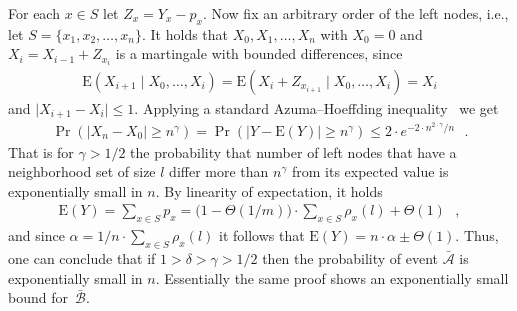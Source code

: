 \let\accentvec\vec \documentclass{llncs}
\newcommand{\keys}{\ensuremath{n}}
\newcommand{\pmf}{\ensuremath{{\rho}}}
\newcommand{\E}{\mathrm{E}}
\newcommand{\blank}{\text{ }}
\newcommand{\low}{\ensuremath{l}}
\newcommand{\abs}[1]{\lvert#1\rvert}
\newcommand{\evA}{{\mathcal{A}}}
\newcommand{\evB}{{\mathcal{B}}}
\begin{document}
For each $x \in S$ let $Z_x=Y_x-p_x$. Now fix an arbitrary order of the left nodes, i.e., let $S=\{x_1,x_2,\ldots,x_n\}$.
It holds that $X_0,X_1,\ldots,X_n$ with $X_0=0$ and $X_i=X_{i-1}+Z_{x_i}$
is a martingale with bounded differences, since 
\begin{align*}
\E(X_{i+1} \mid X_0,\ldots,X_i)= \E(X_{i}+Z_{x_{i+1}} \mid X_0,\ldots,X_i)=X_i 
\end{align*}
and  $\abs{X_{i+1}-X_i}\leq 1$. Applying a standard Azuma–Hoeffding inequality~\cite[Theorem 5.1]{DP_concenctraion_2009} we get
\begin{align*}
 \Pr\left( \abs{X_n-X_0}\geq n^\gamma \right)=\Pr\left( \abs{ Y - \E(Y)}\geq n^\gamma \right)\leq 2\cdot e^{{-2\cdot n^{2\cdot \gamma}}/{n}} \blank.
\end{align*}
That is for $\gamma>1/2$ the probability that number of left nodes that have a neighborhood set of size $\low$ 
differ more than $n^\gamma$ from its expected value is exponentially small in $\keys$. 
By linearity of expectation, it holds 
\begin{align*}
 \E(Y)=\sum_{x \in S}p_x= \big(1-\Theta(1/m) \big) \cdot \sum_{x\in S}\pmf_x(\low) + \Theta(1) \blank,
\end{align*}
and since $\alpha=1/\keys\cdot \sum_{x\in S} \pmf_x(\low)$ it follows that $\E(Y)=\keys \cdot \alpha \pm \Theta(1)$.
Thus, one can conclude that if $1>\delta>\gamma>1/2$ then the probability of event $\bar{\evA}$ is exponentially small in $\keys$.
Essentially the same proof shows an exponentially small bound for~$\bar{\evB}$.
\end{document}

